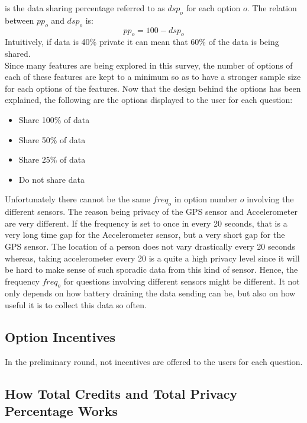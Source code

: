 is the data sharing percentage referred to as $dsp_o$ for each option $o$. The relation between $pp_o$ and $dsp_o$ is:
$$pp_o = 100 - dsp_o$$
Intuitively, if data is 40\% private it can mean that 60\% of the data is being shared.\\
Since many features are being explored in this survey, the number of options of each of these features are kept to a minimum so as to have a stronger
sample size for each options of the features. Now that the design behind the options has been explained, the following are the options displayed to the user for each question:
\begin{itemize}
\item Share 100\% of data
\item Share 50\% of data
\item Share 25\% of data
\item Do not share data

\end{itemize}

Unfortunately there cannot be the same $freq_o$ in option number $o$ involving the different sensors. The reason being privacy of the GPS sensor and Accelerometer are very different. If the frequency is set to  once in every 20 seconds, that is a very long time gap for the Accelerometer sensor, but a very short gap for the GPS sensor. The location of a person does not vary drastically every 20 seconds whereas, taking accelerometer every 20 is a quite a high privacy level since it will be hard to make sense of such sporadic data from this kind of sensor. Hence, the frequency $freq_o$ for questions involving different sensors might be different. It not only depends on how battery
draining the data sending can be, but also on how useful it is to collect this data so often.


\subsection{Option Incentives}
In the preliminary round, not incentives are offered to the users for each question.

\subsection{How Total Credits and Total Privacy Percentage Works}
